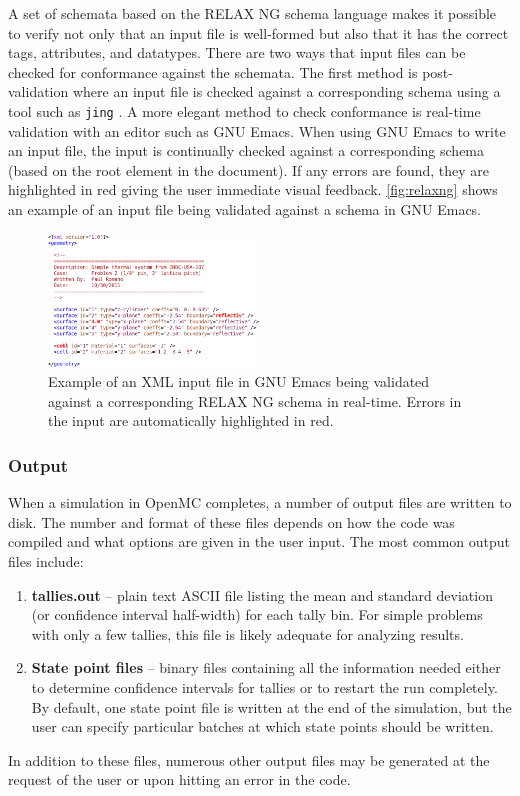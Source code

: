 \documentclass[5p,authoryear]{elsarticle}
\begin{document}
A set of schemata based on the RELAX NG schema language \citep{relaxng-2008}
makes it possible to verify not only that an input file is well-formed but also
that it has the correct tags, attributes, and datatypes. There are two ways that
input files can be checked for conformance against the schemata. The first
method is post-validation where an input file is checked against a corresponding
schema using a tool such as \texttt{jing} \citep{jing-2012}. A more elegant
method to check conformance is real-time validation with an editor such as GNU
Emacs. When using GNU Emacs to write an input file, the input is continually
checked against a corresponding schema (based on the root element in the
document). If any errors are found, they are highlighted in red giving the user
immediate visual feedback. \autoref{fig:relaxng} shows an example of an input
file being validated against a schema in GNU Emacs.
\begin{figure}[htb]
  \centering
  \includegraphics[width=0.5\textwidth]{images/relaxng.png}
  \caption{Example of an XML input file in GNU Emacs being validated against a
    corresponding RELAX NG schema in real-time. Errors in the input are
    automatically highlighted in red.}
  \label{fig:relaxng}
\end{figure}

\subsubsection{Output}

When a simulation in OpenMC completes, a number of output files are written to
disk. The number and format of these files depends on how the code was compiled
and what options are given in the user input. The most common output files
include:
\begin{enumerate}
\item \textbf{tallies.out} -- plain text ASCII file listing the mean and
  standard deviation (or confidence interval half-width) for each tally bin. For
  simple problems with only a few tallies, this file is likely adequate for
  analyzing results.
\item \textbf{State point files} -- binary files containing all the
  information needed either to determine confidence intervals for tallies or to
  restart the run completely. By default, one state point file is written at the
  end of the simulation, but the user can specify particular batches at which
  state points should be written.
\end{enumerate}
In addition to these files, numerous other output files may be generated at the
request of the user or upon hitting an error in the code.
\end{document}
